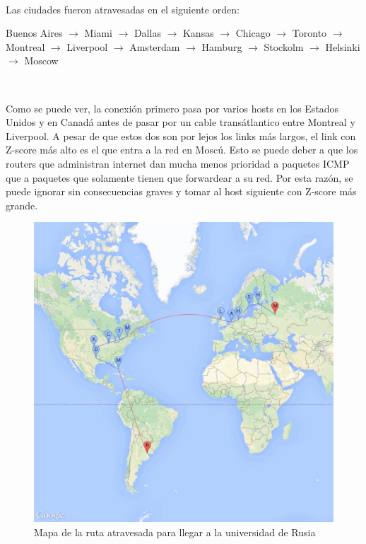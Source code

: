 ~

Las ciudades fueron atravesadas en el siguiente orden:

Buenos Aires $\rightarrow$ Miami $\rightarrow$ Dallas $\rightarrow$ Kansas $\rightarrow$ Chicago
$\rightarrow$ Toronto $\rightarrow$ Montreal $\rightarrow$ Liverpool $\rightarrow$ Amsterdam
$\rightarrow$ Hamburg $\rightarrow$ Stockolm $\rightarrow$ Helsinki $\rightarrow$ Moscow

~

Como se puede ver, la conexi\'on primero pasa por varios hosts en los Estados Unidos y en Canad\'a antes de
pasar por un cable trans\'atlantico entre Montreal y Liverpool. A pesar de que estos dos son por lejos
los links m\'as largos, el link con Z-score m\'as alto es el que entra a la red en Mosc\'u. Esto se puede
deber a que los routers que administran internet dan mucha menos prioridad a paquetes ICMP que a paquetes que
solamente tienen que forwardear a su red. Por esta raz\'on, se puede ignorar sin consecuencias graves y tomar
al host siguiente con Z-score m\'as grande.

\begin{figure}[H]
	\begin{center}
		  \includegraphics[scale=0.25]{../results/maps/MSU.png}
		  \caption{Mapa de la ruta atravesada para llegar a la universidad de Rusia}
	\end{center}
\end{figure}

